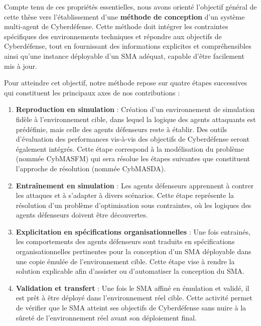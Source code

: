Compte tenu de ces propriétés essentielles, nous avons orienté l'objectif général de cette thèse vers l'établissement d'une \textbf{méthode de conception} d'un système multi-agent de Cyberdéfense. Cette méthode doit intégrer les contraintes spécifiques des environnements techniques et répondre aux objectifs de Cyberdéfense, tout en fournissant des informations explicites et compréhensibles ainsi qu'une instance déployable d'un SMA adéquat, capable d'être facilement mis à jour.

Pour atteindre cet objectif, notre méthode repose sur quatre étapes successives qui constituent les principaux axes de nos contributions :

\begin{enumerate}
    \item \textbf{Reproduction en simulation} : Création d'un environnement de simulation fidèle à l'environnement cible, dans lequel la logique des agents attaquants est prédéfinie, mais celle des agents défenseurs reste à établir. Des outils d'évaluation des performances vis-à-vis des objectifs de Cyberdéfense seront également intégrés. Cette étape correspond à la modélisation du problème (nommée CybMASFM) qui sera résolue les étapes suivantes que constituent l'approche de résolution (nommée CybMASDA).
    
    \item \textbf{Entraînement en simulation} : Les agents défenseurs apprennent à contrer les attaques et à s'adapter à divers scénarios. Cette étape représente la résolution d'un problème d'optimisation sous contraintes, où les logiques des agents défenseurs doivent être découvertes.
    
    \item \textbf{Explicitation en spécifications organisationnelles} : Une fois entrainés, les comportements des agents défenseurs sont traduits en spécifications organisationnelles pertinentes pour la conception d'un SMA déployable dans une copie émulée de l'environnement cible. Cette étape vise à rendre la solution explicable afin d'assister ou d'automatiser la conception du SMA.
    
    \item \textbf{Validation et transfert} : Une fois le SMA affiné en émulation et validé, il est prêt à être déployé dans l'environnement réel cible. Cette activité permet de vérifier que le SMA atteint ses objectifs de Cyberdéfense sans nuire à la sûreté de l'environnement réel avant son déploiement final.
\end{enumerate}

